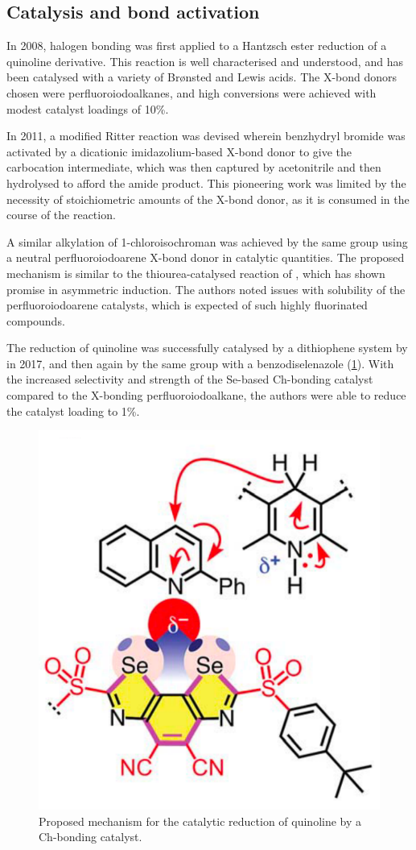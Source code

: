 \begin{refsection}
\subsection{Catalysis and bond activation}
In 2008, halogen bonding was first applied to a Hantzsch ester reduction of a quinoline derivative.\autocite{Bruckmann2008}
This reaction is well characterised and understood, and has been catalysed with a variety of Br\o nsted and Lewis acids.
The X-bond donors chosen were perfluoroiodoalkanes, and high conversions were achieved with modest catalyst loadings of 10\%.

In 2011, a modified Ritter reaction was devised wherein benzhydryl bromide was activated by a dicationic imidazolium-based X-bond donor to give the carbocation intermediate, which was then captured by acetonitrile and then hydrolysed to afford the amide product.\autocite{Walter2011}
This pioneering work was limited by the necessity of stoichiometric amounts of the X-bond donor, as it is consumed in the course of the reaction.

A similar alkylation of 1-chloroisochroman was achieved by the same group using a neutral perfluoroiodoarene X-bond donor in catalytic quantities.\autocite{Kniep2013}
The proposed mechanism is similar to the thiourea-catalysed reaction of \citeauthor{Reisman2008}\autocite{Reisman2008}, which has shown promise in asymmetric induction.
The authors noted issues with solubility of the perfluoroiodoarene catalysts, which is expected of such highly fluorinated compounds.

The reduction of quinoline was successfully catalysed by a dithiophene system by \citeauthor{Benz2017} in 2017\autocite{Benz2017}, and then again by the same group with a benzodiselenazole (\cref{fig:quinoline-redn}).\autocite{Benz2017a}
With the increased selectivity and strength of the Se-based Ch-bonding catalyst compared to the X-bonding perfluoroiodoalkane, the authors were able to reduce the catalyst loading to 1\%.

\begin{figure}
    \centering
    \includegraphics[width=0.4\linewidth]{Figures/quinoline-redn.pdf}
    \caption[Proposed mechanism for the catalytic reduction of quinoline by a Ch-bonding catalyst.]{Proposed mechanism for the catalytic reduction of quinoline by a Ch-bonding catalyst.\autocite{Benz2017}}\label{fig:quinoline-redn}
\end{figure}


\end{refsection}
